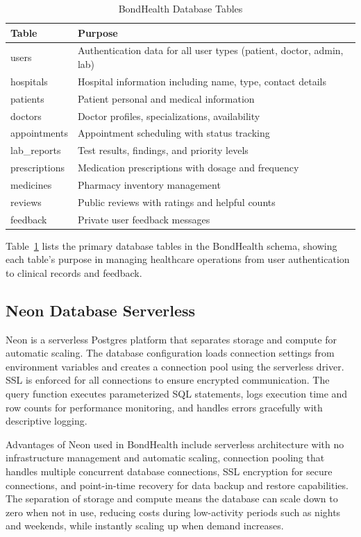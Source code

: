 \begin{table}[H]
\centering
\caption{BondHealth Database Tables}
\label{tab:tables}
\begin{tabular}{|l|p{8cm}|}
\hline
\textbf{Table} & \textbf{Purpose} \\
\hline
users & Authentication data for all user types (patient, doctor, admin, lab) \\
\hline
hospitals & Hospital information including name, type, contact details \\
\hline
patients & Patient personal and medical information \\
\hline
doctors & Doctor profiles, specializations, availability \\
\hline
appointments & Appointment scheduling with status tracking \\
\hline
lab\_reports & Test results, findings, and priority levels \\
\hline
prescriptions & Medication prescriptions with dosage and frequency \\
\hline
medicines & Pharmacy inventory management \\
\hline
reviews & Public reviews with ratings and helpful counts \\
\hline
feedback & Private user feedback messages \\
\hline
\end{tabular}
\end{table}
\noindent Table~\ref{tab:tables} lists the primary database tables in the BondHealth schema, showing each table's purpose in managing healthcare operations from user authentication to clinical records and feedback.

\subsection{Neon Database Serverless}

\justifying
\noindent Neon is a serverless Postgres platform that separates storage and compute for automatic scaling. The database configuration loads connection settings from environment variables and creates a connection pool using the serverless driver. SSL is enforced for all connections to ensure encrypted communication. The query function executes parameterized SQL statements, logs execution time and row counts for performance monitoring, and handles errors gracefully with descriptive logging.

\justifying
\noindent Advantages of Neon used in BondHealth include serverless architecture with no infrastructure management and automatic scaling, connection pooling that handles multiple concurrent database connections, SSL encryption for secure connections, and point-in-time recovery for data backup and restore capabilities. The separation of storage and compute means the database can scale down to zero when not in use, reducing costs during low-activity periods such as nights and weekends, while instantly scaling up when demand increases.

